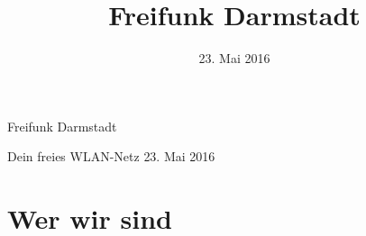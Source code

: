 \documentclass[10pt]{beamer}
\title{Freifunk Darmstadt}
\author{}
\institute[Inst.]{eine Initiative des Chaos Darmstadt e.V.}
\date{\footnotesize 23. Mai 2016}
\begin{document}
{
  \begin{frame}
    \begin{huge}
      Freifunk Darmstadt
    \end{huge}
    \vspace{0.25em}
    \newline
    Dein freies WLAN-Netz
    \newline
    \vspace{0.5em}
    \newline
    \small{23. Mai 2016}
    \vfill
  \end{frame}
}

  \section{Wer wir sind}
\end{document}
